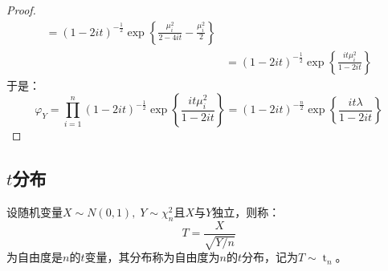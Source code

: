 \begin{proof}
\begin{align*}
		=(1-2it)^{-\frac{1}{2}}\exp\left\{\frac{\mu_i^2}{2-4it}-\frac{\mu_i^2}{2}\right\} \\
		&=(1-2it)^{-\frac{1}{2}}\exp\left\{\frac{it\mu_i^2}{1-2it}\right\}
	\end{align*}
	于是：
	\begin{equation*}
		\varphi_{Y}=\prod_{i=1}^n(1-2it)^{-\frac{1}{2}}\exp\left\{\frac{it\mu_i^2}{1-2it}\right\}=(1-2it)^{-\frac{n}{2}}\exp\left\{\frac{it\lambda}{1-2it}\right\}
	\end{equation*}\par
\end{proof}

\subsection{$t$分布}
\begin{definition}
	设随机变量$X\sim N(0,1),\;Y\sim\chi_n^2$且$X$与$Y$独立，则称：
	\begin{equation*}
		T=\frac{X}{\sqrt{Y/ n}}
	\end{equation*}
	为自由度是$n$的$t$变量，其分布称为自由度为$n$的$t$分布，记为$T\sim \operatorname{t}_n$。
\end{definition}

